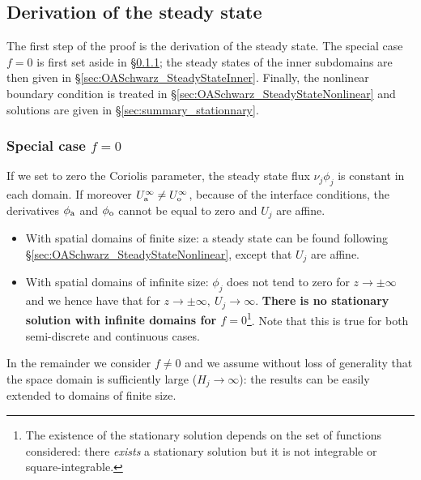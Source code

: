 \subsection{Derivation of the steady state}
\label{sec:OASchwarz_SteadyState}
The first step of the proof is the derivation of the
steady state. The special case $f=0$ is first set aside in
\S\ref{sec:OASchwarz_SteadyStatef0}; the steady states of
the inner subdomains are then given in 
\S\ref{sec:OASchwarz_SteadyStateInner}.
Finally, the nonlinear boundary condition is treated
in \S\ref{sec:OASchwarz_SteadyStateNonlinear}
and solutions are given in \S\ref{sec:summary_stationnary}.
\subsubsection{Special case $f=0$}
\label{sec:OASchwarz_SteadyStatef0}
If we set to zero the Coriolis parameter,
the steady state flux $\nu_j\phi_j$ is constant in each domain.
If moreover $U_{\rm a}^{\infty} \neq U_{\rm o}^{\infty}$,
because of the interface conditions,
the derivatives $\phi_{\rm a}$ and $\phi_{\rm o}$
cannot be equal to zero and $U_j$ are affine.
\begin{itemize}
	\item With spatial domains of finite size:
	a steady state can be found following
	\S\ref{sec:OASchwarz_SteadyStateNonlinear},
		except that $U_j$ are affine.
	\item With spatial domains of infinite size:
	$\phi_j$ does not tend to zero for
	$z\rightarrow \pm \infty$ and we hence have
	that for $z\rightarrow \pm \infty,~ U_j \rightarrow \infty$.
\textbf{There is no stationary solution with infinite domains
for $f=0$}\footnote{The existence of the stationary solution
depends on the set of functions considered: there
\textit{exists} a stationary solution but it is not
integrable or square-integrable.}.
Note that this is true for both semi-discrete
and continuous cases.
\end{itemize}
In the remainder we consider $f \neq 0$ and we assume without loss of
generality that the space domain is sufficiently
large ($H_j \rightarrow \infty$): the results can be easily
extended to domains of finite size.
